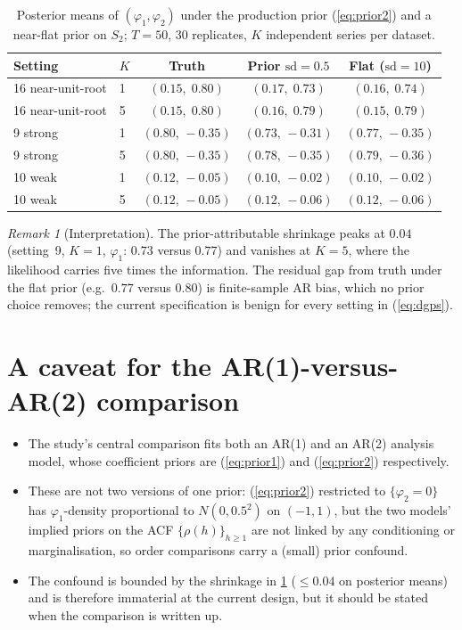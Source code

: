 \documentclass[11pt]{article}
\newcommand{\eref}[1]{(\ref{#1})}
\theoremstyle{plain}
\theoremstyle{definition}
\theoremstyle{remark}
\newtheorem{remark}[proposition]{Remark}
\begin{document}
\begin{table}[ht]
\centering
\caption{Posterior means of $(\varphi_1, \varphi_2)$ under the production
         prior \eref{eq:prior2} and a near-flat prior on $S_2$; $T = 50$,
         $30$ replicates, $K$ independent series per dataset.}
\label{tab:shrink}
\begin{tabular}{llccc}
\toprule
Setting & $K$ & Truth & Prior $\mathrm{sd} = 0.5$ & Flat
  ($\mathrm{sd} = 10$) \\
\midrule
16 near-unit-root & 1 & $(0.15,\; 0.80)$  & $(0.17,\; 0.73)$  & $(0.16,\; 0.74)$ \\
16 near-unit-root & 5 & $(0.15,\; 0.80)$  & $(0.16,\; 0.79)$  & $(0.15,\; 0.79)$ \\
9 strong          & 1 & $(0.80,\, -0.35)$ & $(0.73,\, -0.31)$ & $(0.77,\, -0.35)$ \\
9 strong          & 5 & $(0.80,\, -0.35)$ & $(0.78,\, -0.35)$ & $(0.79,\, -0.36)$ \\
10 weak           & 1 & $(0.12,\, -0.05)$ & $(0.10,\, -0.02)$ & $(0.10,\, -0.02)$ \\
10 weak           & 5 & $(0.12,\, -0.05)$ & $(0.12,\, -0.06)$ & $(0.12,\, -0.06)$ \\
\bottomrule
\end{tabular}
\end{table}

\begin{remark}[Interpretation]\label{rem:shrink}
The prior-attributable shrinkage peaks at $0.04$ (setting~9, $K = 1$,
$\varphi_1$: $0.73$ versus $0.77$) and vanishes at $K = 5$, where the
likelihood carries five times the information. The residual gap from truth
under the flat prior (e.g.\ $0.77$ versus $0.80$) is finite-sample AR bias,
which no prior choice removes; the current specification is benign for every
setting in \eref{eq:dgps}.
\end{remark}

\section{A caveat for the AR(1)-versus-AR(2) comparison}\label{sec:caveat}

\begin{itemize}
  \item The study's central comparison fits both an AR(1) and an AR(2)
        analysis model, whose coefficient priors are \eref{eq:prior1} and
        \eref{eq:prior2} respectively.
  \item These are not two versions of one prior: \eref{eq:prior2} restricted
        to $\{\varphi_2 = 0\}$ has $\varphi_1$-density proportional to
        $N(0, 0.5^2)$ on $(-1, 1)$, but the two models' implied priors on the
        ACF $\{\rho(h)\}_{h \geq 1}$ are not linked by any conditioning or
        marginalisation, so order comparisons carry a (small) prior confound.
  \item The confound is bounded by the shrinkage in \cref{tab:shrink}
        ($\leq 0.04$ on posterior means) and is therefore immaterial at the
        current design, but it should be stated when the comparison is
        written up.
\end{itemize}
\end{document}
